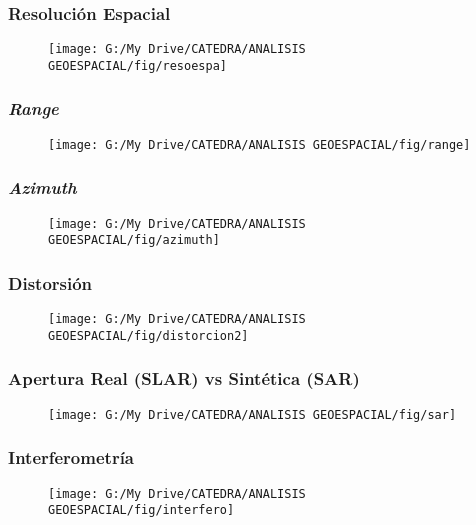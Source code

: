 \documentclass[14pt]{beamer}
\begin{document}
\begin{frame}
\frametitle{Resolución Espacial}
 \begin{figure}
    \centering
    \texttt{[image: G:/My Drive/CATEDRA/ANALISIS GEOESPACIAL/fig/resoespa]}
  \end{figure}
\end{frame}
\begin{frame}
\frametitle{\emph{Range}}
 \begin{figure}
    \centering
    \texttt{[image: G:/My Drive/CATEDRA/ANALISIS GEOESPACIAL/fig/range]}
  \end{figure}
\end{frame}
\begin{frame}
\frametitle{\emph{Azimuth}}
 \begin{figure}
    \centering
    \texttt{[image: G:/My Drive/CATEDRA/ANALISIS GEOESPACIAL/fig/azimuth]}
  \end{figure}
\end{frame}
\begin{frame}
\frametitle{Distorsión}
 \begin{figure}
    \centering
    \texttt{[image: G:/My Drive/CATEDRA/ANALISIS GEOESPACIAL/fig/distorcion2]}
  \end{figure}
\end{frame}
\begin{frame}
\frametitle{Apertura Real (SLAR) vs Sintética (SAR)}
 \begin{figure}
    \centering
    \texttt{[image: G:/My Drive/CATEDRA/ANALISIS GEOESPACIAL/fig/sar]}
  \end{figure}
\end{frame}
\begin{frame}
\frametitle{Interferometría}
 \begin{figure}
    \centering
    \texttt{[image: G:/My Drive/CATEDRA/ANALISIS GEOESPACIAL/fig/interfero]}
  \end{figure}
\end{frame}
\end{document}
